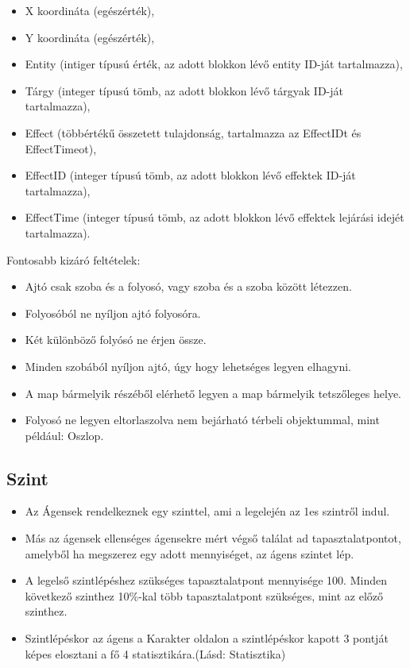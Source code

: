 \begin{itemize}
    \item X koordináta (egészérték),
    \item Y koordináta (egészérték),
    \item Entity (intiger típusú érték,  az adott blokkon lévő entity ID-ját tartalmazza),
    \item Tárgy (integer típusú tömb, az adott blokkon lévő tárgyak ID-ját tartalmazza),
    \item Effect (többértékű összetett tulajdonság, tartalmazza az EffectIDt és EffectTimeot),
    \item EffectID (integer típusú tömb, az adott blokkon lévő effektek ID-ját tartalmazza),
    \item EffectTime (integer típusú tömb, az adott blokkon lévő effektek lejárási idejét tartalmazza).
\end{itemize}

\noindent Fontosabb kizáró feltételek:

\begin{itemize}
    \item Ajtó csak szoba és a folyosó, vagy szoba és a szoba között létezzen.
    \item Folyosóból ne nyíljon ajtó folyosóra.
    \item Két különböző folyósó ne érjen össze.
    \item Minden szobából nyíljon ajtó, úgy hogy lehetséges legyen elhagyni.
    \item A map bármelyik részéből elérhető legyen a map bármelyik tetszőleges helye.
    \item Folyosó ne legyen eltorlaszolva nem bejárható térbeli objektummal, mint például: Oszlop.
\end{itemize}


\subsection{Szint}

\begin{itemize}
    \item Az Ágensek rendelkeznek egy szinttel, ami a legelején az 1es szintről indul.
    \item Más az ágensek ellenséges ágensekre mért végső találat ad tapasztalatpontot, amelyből ha megszerez egy adott mennyiséget, az ágens szintet lép.
    \item A legelső szintlépéshez szükséges tapasztalatpont mennyisége 100. Minden következő szinthez 10\%-kal több tapasztalatpont szükséges, mint az előző szinthez.
    \item Szintlépéskor az ágens a Karakter oldalon a szintlépéskor kapott 3 pontját képes elosztani a fő 4 statisztikára.(Lásd: Statisztika)
\end{itemize}

